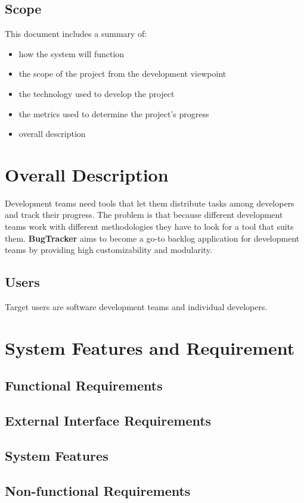 \documentclass[a4paper]{article}
\newcommand{\appNameBold}{\textbf{BugTracker}}
\begin{document}
    \subsection{Scope}
    This document includes a summary of:
    \begin{itemize}
        \item how the system will function
        \item the scope of the project from the development viewpoint
        \item the technology used to develop the project
        \item the metrics used to determine the project's progress
        \item overall description
    \end{itemize}

    \section{Overall Description}
    Development teams need tools that let them distribute tasks among developers and track their progress.
    The problem is that because different development teams work with different methodologies they have to look for a tool that suits them.
    \appNameBold{} aims to become a go-to backlog application for development teams by providing high customizability and modularity.

    \subsection{Users}
    Target users are software development teams and individual developers.

    \section{System Features and Requirement}
    \subsection{Functional Requirements}
    \subsection{External Interface Requirements}
    \subsection{System Features}
    \subsection{Non-functional Requirements}
\end{document}
